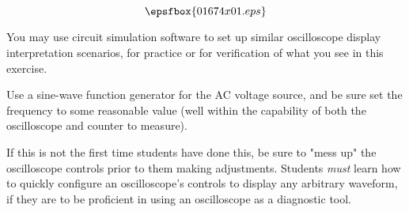 

$$\epsfbox{01674x01.eps}$$

\vfil \eject






You may use circuit simulation software to set up similar oscilloscope display interpretation scenarios, for practice or for verification of what you see in this exercise.







Use a sine-wave function generator for the AC voltage source, and be sure set the frequency to some reasonable value (well within the capability of both the oscilloscope and counter to measure).

If this is not the first time students have done this, be sure to "mess up" the oscilloscope controls prior to them making adjustments.  Students {\it must} learn how to quickly configure an oscilloscope's controls to display any arbitrary waveform, if they are to be proficient in using an oscilloscope as a diagnostic tool.




